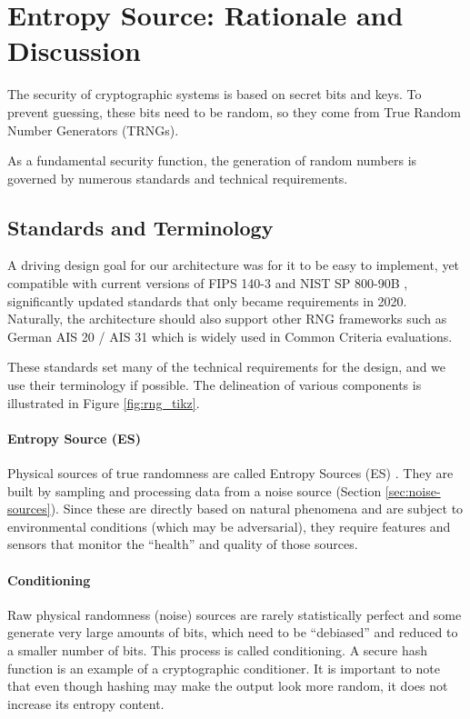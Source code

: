 
\newpage
\section{Entropy Source: Rationale and Discussion}
\label{sec:entropy-appendix}

    The security of cryptographic systems is based on secret bits and keys.
    To prevent guessing, these bits need to be random, so they come from
    True Random Number Generators (TRNGs).

    As a fundamental security function, the generation of random numbers is
    governed by numerous standards and technical requirements.

\subsection{Standards and Terminology}

    A driving design goal for our architecture was for it to be easy to
    implement, yet compatible with current versions of FIPS 140-3
    \cite{NI19} and NIST SP 800-90B \cite{TuBaKe+18}, significantly
    updated standards that only became requirements in 2020. Naturally,
    the architecture should also support other RNG frameworks such as
    German AIS 20 / AIS 31 \cite{KiSc01,KiSc11,BS13} which is widely used
    in Common Criteria evaluations.

    These standards set many of the technical requirements for the design,
    and we use their terminology if possible.
    The delineation of various components is illustrated in Figure
    \ref{fig:rng_tikz}.


    \paragraph{Entropy Source (ES)}
    \label{sec:intro-es}
    Physical sources of true randomness are called Entropy Sources (ES)
    \cite{TuBaKe+18}. They are built by sampling and processing data
    from a noise source (Section \ref{sec:noise-sources}). Since these
    are directly based on natural phenomena and are subject to
    environmental conditions (which may be adversarial), they require
    features and sensors that monitor the ``health'' and quality of those
    sources.

    \paragraph{Conditioning}
    \label{sec:intro-cond}
    Raw physical randomness (noise) sources are rarely statistically
    perfect and some generate very large amounts of bits, which need to be
    ``debiased'' and reduced to a smaller number of bits. This process is
    called conditioning. A secure hash function is an example of a
    cryptographic conditioner. It is important to note that even though
    hashing may make the output look more random, it does not increase its
    entropy content.

